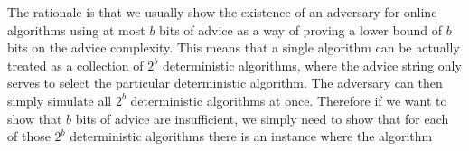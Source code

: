 The rationale is that we usually show the existence of an adversary for
online algorithms using at most $b$ bits of advice as a way of proving a
lower bound of $b$ bits on the advice complexity. This means that a single
algorithm can be actually treated as a collection of $2^b$ deterministic
algorithms, where the advice string only serves to select the particular
deterministic algorithm. The adversary can then simply simulate all $2^b$
deterministic algorithms at once. Therefore if we want to show that $b$
bits of advice are insufficient, we simply need to show that for each of
those $2^b$ deterministic algorithms there is an instance where the
algorithm 
